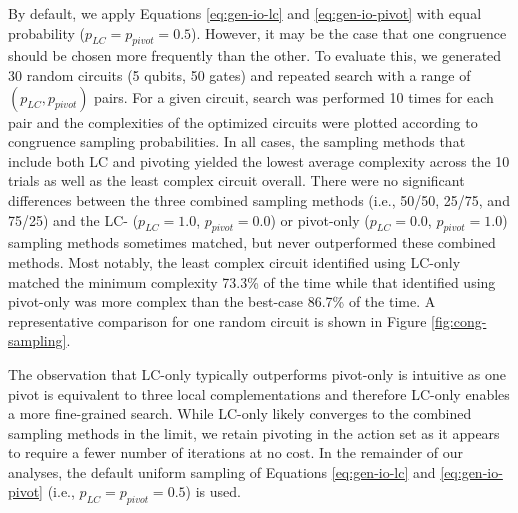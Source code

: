 By default, we apply Equations \ref{eq:gen-io-lc} and \ref{eq:gen-io-pivot} with equal probability ($p_{LC} = p_{pivot} = 0.5$).
However, it may be the case that one congruence should be chosen more frequently than the other.
To evaluate this, we generated 30 random circuits (5 qubits, 50 gates) and repeated search with a range of $(p_{LC}, p_{pivot})$ pairs.
For a given circuit, search was performed 10 times for each pair and the complexities of the optimized circuits were plotted according to congruence sampling probabilities.
In all cases, the sampling methods that include both LC and pivoting yielded the lowest average complexity across the 10 trials as well as the least complex circuit overall.
There were no significant differences between the three combined sampling methods (i.e., 50/50, 25/75, and 75/25) and the LC- ($p_{LC} = 1.0$, $p_{pivot} = 0.0$) or pivot-only ($p_{LC} = 0.0$, $p_{pivot} = 1.0$) sampling methods sometimes matched, but never outperformed these combined methods.
Most notably, the least complex circuit identified using LC-only matched the minimum complexity 73.3\% of the time while that identified using pivot-only was more complex than the best-case 86.7\% of the time.
A representative comparison for one random circuit is shown in Figure \ref{fig:cong-sampling}.

The observation that LC-only typically outperforms pivot-only is intuitive as one pivot is equivalent to three local complementations and therefore LC-only enables a more fine-grained search.
While LC-only likely converges to the combined sampling methods in the limit, we retain pivoting in the action set as it appears to require a fewer number of iterations at no cost.
In the remainder of our analyses, the default uniform sampling of Equations \ref{eq:gen-io-lc} and \ref{eq:gen-io-pivot} (i.e., $p_{LC} = p_{pivot} = 0.5$) is used.


